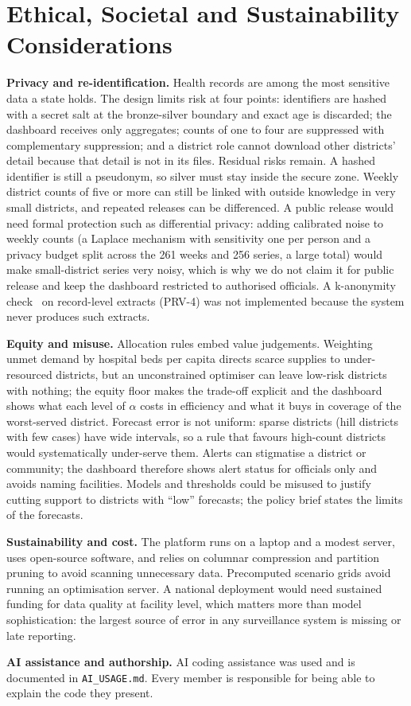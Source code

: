 \section{Ethical, Societal and Sustainability Considerations}\label{sec:ethics}
\textbf{Privacy and re-identification.} Health records are among the most sensitive data a state holds. The design limits risk at four points: identifiers are hashed with a secret salt at the bronze-silver boundary and exact age is discarded; the dashboard receives only aggregates; counts of one to four are suppressed with complementary suppression; and a district role cannot download other districts' detail because that detail is not in its files. Residual risks remain. A hashed identifier is still a pseudonym, so silver must stay inside the secure zone. Weekly district counts of five or more can still be linked with outside knowledge in very small districts, and repeated releases can be differenced. A public release would need formal protection such as differential privacy: adding calibrated noise to weekly counts (a Laplace mechanism with sensitivity one per person and a privacy budget split across the 261 weeks and 256 series, a large total) would make small-district series very noisy, which is why we do not claim it for public release and keep the dashboard restricted to authorised officials. A k-anonymity check~\cite{sweeney} on record-level extracts (PRV-4) was not implemented because the system never produces such extracts.

\textbf{Equity and misuse.} Allocation rules embed value judgements. Weighting unmet demand by hospital beds per capita directs scarce supplies to under-resourced districts, but an unconstrained optimiser can leave low-risk districts with nothing; the equity floor makes the trade-off explicit and the dashboard shows what each level of $\alpha$ costs in efficiency and what it buys in coverage of the worst-served district. Forecast error is not uniform: sparse districts (hill districts with few cases) have wide intervals, so a rule that favours high-count districts would systematically under-serve them. Alerts can stigmatise a district or community; the dashboard therefore shows alert status for officials only and avoids naming facilities. Models and thresholds could be misused to justify cutting support to districts with ``low'' forecasts; the policy brief states the limits of the forecasts.

\textbf{Sustainability and cost.} The platform runs on a laptop and a modest server, uses open-source software, and relies on columnar compression and partition pruning to avoid scanning unnecessary data. Precomputed scenario grids avoid running an optimisation server. A national deployment would need sustained funding for data quality at facility level, which matters more than model sophistication: the largest source of error in any surveillance system is missing or late reporting.

\textbf{AI assistance and authorship.} AI coding assistance was used and is documented in \texttt{AI\_USAGE.md}. Every member is responsible for being able to explain the code they present.
